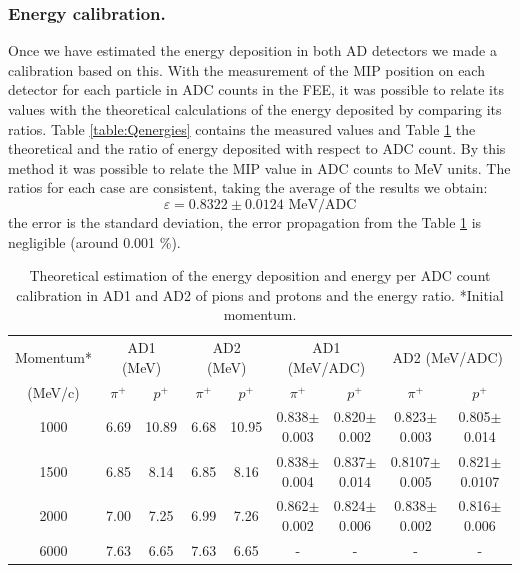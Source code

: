 	\subsubsection{Energy calibration.}
	
	Once we have estimated the energy deposition in both AD detectors we made a calibration based on this.
	With the measurement of the MIP position on each detector for each particle in ADC counts in the FEE, it was possible to relate its values with the theoretical calculations of the energy deposited by comparing its ratios. 
	Table \ref{table:Qenergies} contains the measured values and Table \ref{table:AD_ElossAndWChannel} the theoretical and the ratio of energy deposited with respect to ADC count. 
	By this method it was possible to relate the MIP value in ADC counts to MeV units.
	The ratios for each case are consistent, taking the average of the results we obtain:
	\begin{equation}
	\varepsilon=0.8322 \pm 0.0124 \,\, \textrm{MeV/ADC}
	\end{equation}
	the error is the standard deviation, the error propagation from the Table \ref{table:AD_ElossAndWChannel} is
	negligible (around 0.001 \%). %
	
	
	\begin{table}[hb!]
		\centering
		\begin{tabular}{ |c||c c |c c ||c c |c c| }
			\hline
			Momentum* & \multicolumn{2}{|c|}{AD1 (MeV)}& 
			\multicolumn{2}{|c||}{AD2 (MeV)}& 
			\multicolumn{2}{|c|}{AD1 (MeV/ADC)}&
		 \multicolumn{2}{|c|}{AD2 (MeV/ADC)}   \\ \cline{2-9}
			
			(MeV/c)& $\pi^+$& $p^+$& $\pi^+$& $p^+$ &  	$\pi^+$& $p^+$& $\pi^+$& $p^+$ \\ \hline
			1000& 6.69&	10.89& 6.68&	10.95&		
			0.838$\pm$0.003 &0.820$\pm$0.002 &0.823$\pm$0.003&	0.805$\pm$0.014\\
			1500& 6.85&	8.14&	6.85&	8.16& 		
			0.838$\pm$0.004 &0.837$\pm$0.014 &0.8107$\pm$0.005&	0.821$\pm$0.0107\\
			2000& 7.00&	7.25&	6.99&	7.26& 		
			0.862$\pm$0.002 &0.824$\pm$0.006 &0.838$\pm$0.002&	0.816$\pm$0.006\\
			6000& 7.63&	6.65&	7.63&	6.65& 		-&  - &-&-\\ \hline
			\hline
		\end{tabular}
		\caption{Theoretical estimation of the energy deposition and energy per ADC count calibration in AD1 and AD2
			of pions and protons and the energy
			ratio. *Initial momentum.}
		\label{table:AD_ElossAndWChannel}
	\end{table}

